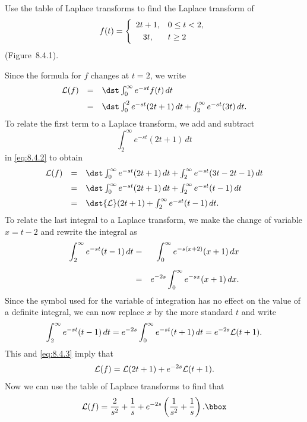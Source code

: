 \setcounter{example}{0}
\setcounter{equation}{0}
\begin{example}
  \label{example:8.4.1}\rm Use the table of Laplace transforms to find the Laplace transform of
  \begin{equation}
    \label{eq:8.4.1}f(t)=\left\{
    \begin{array}{cl}
      2t+1, & 0\le t<2, \\[1\jot]
      3t,   & t\ge2
    \end{array}\right.
  \end{equation}
  (Figure~8.4.1).
\end{example}
\setcounter{equation}{1}
\begin{examplesolution}
\solution Since the formula for $f$ changes at $t=2$, we write
\begin{equation}
  \label{eq:8.4.2}
  \begin{array}{ccl}
    {\cal L}(f) & = & \dst\int_{0}^{\infty}e^{-st}f(t)\,dt                                \\[2\jot]
                & = & \dst\int_{0}^{2}e^{-st}(2t+1)\,dt+\int_{2}^{\infty}e^{-st}(3t)\,dt.
  \end{array}
\end{equation}
To relate the first term to a Laplace transform, we add and subtract
\[
  \int_{2}^{\infty}e^{-st}(2t+1)\,dt
\]
in \eqref{eq:8.4.2} to obtain
\begin{equation}
  \label{eq:8.4.3}
  \begin{array}{ccl}
    {\cal L}(f) & = & \dst\int_{0}^{\infty}e^{-st}(2t+1)\,dt+ \int_{2}^{\infty}e^{-st}(3t-2t-1)\,dt \\[2\jot]
                & = & \dst\int_{0}^{\infty}e^{-st}(2t+1)\,dt+ \int_{2}^{\infty}e^{-st}(t-1)\,dt     \\[2\jot]
                & = & \dst{\cal L}(2t+1)+\int_{2}^{\infty}e^{-st}(t-1)\,dt.
  \end{array}
\end{equation}
To relate the last integral to a Laplace transform, we make the change of variable $x=t-2$ and
rewrite the integral as
\begin{eqnarray*}
  \int_{2}^{\infty}e^{-st}(t-1)\,dt & = & \int_{0}^{\infty}e^{-s(x+2)}(x+1)\,dx \\[2\jot]
                                    & = & e^{-2s}\int_{0}^{\infty}e^{-sx}(x+1)\,dx.
\end{eqnarray*}
Since the symbol used for the variable of integration has no effect on the value of a definite
integral, we can now replace $x$ by the more standard $t$ and write
\[
  \int_{2}^{\infty}e^{-st}(t-1)\,dt =e^{-2s}\int_{0}^{\infty}e^{-st}(t+1)\,dt=e^{-2s}{\cal L}(t+1).
\]
This and \eqref{eq:8.4.3} imply that
\[
  {\cal L}(f)={\cal L}(2t+1)+e^{-2s}{\cal L}(t+1).
\]
Now we can use the table of Laplace transforms to find that
\[
  {\cal L}(f)=\frac{2}{s^{2}}+\frac{1}{s}+e^{-2s}\left(\frac{1}{s^{2}}+\frac{1}{s}\right).\bbox
\]
\end{examplesolution}

